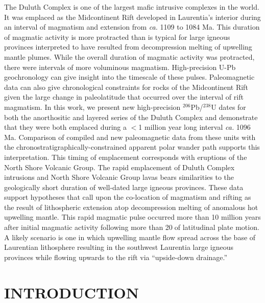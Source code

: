 \documentclass[11pt,letterpaper]{article}
\begin{document}
The Duluth Complex is one of the largest mafic intrusive complexes in the world. It was emplaced as the Midcontinent Rift developed in Laurentia's interior during an interval of magmatism and extension from \textit{ca.} 1109 to 1084 Ma. This duration of magmatic activity is more protracted than is typical for large igneous provinces interpreted to have resulted from decompression melting of upwelling mantle plumes. While the overall duration of magmatic activity was protracted, there were intervals of more voluminous magmatism. High-precision U-Pb geochronology can give insight into the timescale of these pulses. Paleomagnetic data can also give chronological constraints for rocks of the Midcontinent Rift given the large change in paleolatitude that occurred over the interval of rift magmatism. In this work, we present new high-precision $^{206}$Pb/$^{238}$U dates for both the anorthositic and layered series of the Duluth Complex and demonstrate that they were both emplaced during a $<$1 million year long interval \textit{ca.} 1096 Ma. Comparison of compiled and new paleomagnetic data from these units with the chronostratigraphically-constrained apparent polar wander path supports this interpretation. This timing of emplacement corresponds with eruptions of the North Shore Volcanic Group. The rapid emplacement of Duluth Complex intrusions and North Shore Volcanic Group lavas bears similarities to the geologically short duration of well-dated large igneous provinces. These data support hypotheses that call upon the co-location of magmatism and rifting as the result of lithospheric extension atop decompression melting of anomalous hot upwelling mantle. This rapid magmatic pulse occurred more than 10 million years after initial magmatic activity following more than 20\textdegree$\;$of latitudinal plate motion. A likely scenario is one in which upwelling mantle flow spread across the base of Laurentian lithosphere resulting in the southwest Laurentia large igneous provinces while flowing upwards to the rift via ``upside-down drainage.''


\section*{INTRODUCTION}
\end{document}

